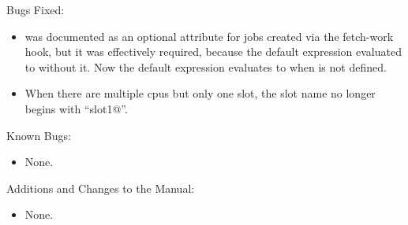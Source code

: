 \noindent Bugs Fixed:

\begin{itemize}

\item {} was documented as an optional attribute for
  jobs created via the fetch-work hook, but it was effectively
  required, because the default 
  expression evaluated to  without it.  Now the
  default  expression evaluates to
   when  is not defined.

\item When there are multiple cpus but only one slot, the slot name no
longer begins with ``slot1@''.

\end{itemize}

\noindent Known Bugs:

\begin{itemize}

\item None.

\end{itemize}

\noindent Additions and Changes to the Manual:

\begin{itemize}

\item None.

\end{itemize}

